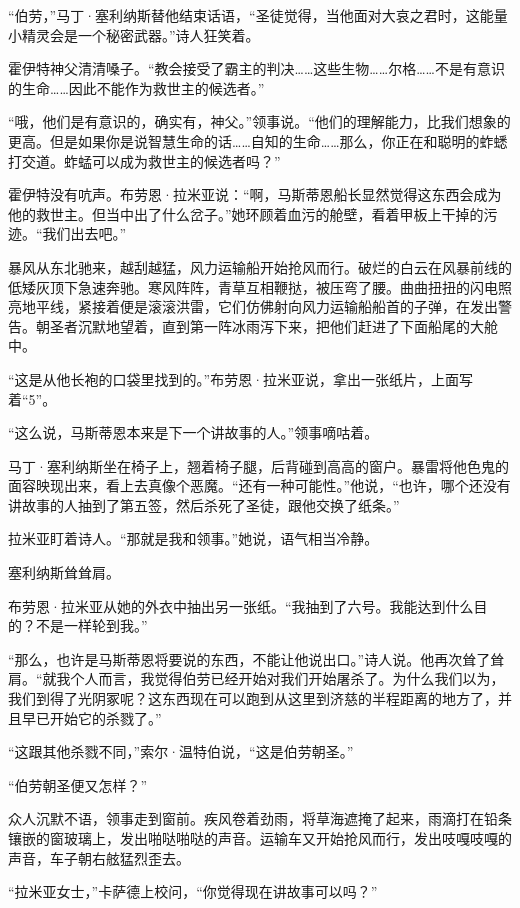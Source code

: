 \documentclass[AutoFakeBold=true]{book}
\begin{document}
``伯劳，''马丁·塞利纳斯替他结束话语，``圣徒觉得，当他面对大哀之君时，这能量小精灵会是一个秘密武器。''诗人狂笑着。

霍伊特神父清清嗓子。``教会接受了霸主的判决……这些生物……尔格……不是有意识的生命……因此不能作为救世主的候选者。''

``哦，他们是有意识的，确实有，神父。''领事说。``他们的理解能力，比我们想象的更高。但是如果你是说智慧生命的话……自知的生命……那么，你正在和聪明的蚱蟋打交道。蚱蜢可以成为救世主的候选者吗？''

霍伊特没有吭声。布劳恩·拉米亚说：``啊，马斯蒂恩船长显然觉得这东西会成为他的救世主。但当中出了什么岔子。''她环顾着血污的舱壁，看着甲板上干掉的污迹。``我们出去吧。''

\vspace*{1em}

暴风从东北驰来，越刮越猛，风力运输船开始抢风而行。破烂的白云在风暴前线的低矮灰顶下急速奔驰。寒风阵阵，青草互相鞭挞，被压弯了腰。曲曲扭扭的闪电照亮地平线，紧接着便是滚滚洪雷，它们仿佛射向风力运输船船首的子弹，在发出警告。朝圣者沉默地望着，直到第一阵冰雨泻下来，把他们赶进了下面船尾的大舱中。

``这是从他长袍的口袋里找到的。''布劳恩·拉米亚说，拿出一张纸片，上面写着``5''。

``这么说，马斯蒂恩本来是下一个讲故事的人。''领事嘀咕着。

马丁·塞利纳斯坐在椅子上，翘着椅子腿，后背碰到高高的窗户。暴雷将他色鬼的面容映现出来，看上去真像个恶魔。``还有一种可能性。''他说，``也许，哪个还没有讲故事的人抽到了第五签，然后杀死了圣徒，跟他交换了纸条。''

拉米亚盯着诗人。``那就是我和领事。''她说，语气相当冷静。

塞利纳斯耸耸肩。

布劳恩·拉米亚从她的外衣中抽出另一张纸。``我抽到了六号。我能达到什么目的？不是一样轮到我。''

``那么，也许是马斯蒂恩将要说的东西，不能让他说出口。''诗人说。他再次耸了耸肩。``就我个人而言，我觉得伯劳已经开始对我们开始屠杀了。为什么我们以为，我们到得了光阴冢呢？这东西现在可以跑到从这里到济慈的半程距离的地方了，并且早已开始它的杀戮了。''

``这跟其他杀戮不同，''索尔·温特伯说，``这是伯劳朝圣。''

``伯劳朝圣便又怎样？''

众人沉默不语，领事走到窗前。疾风卷着劲雨，将草海遮掩了起来，雨滴打在铅条镶嵌的窗玻璃上，发出啪哒啪哒的声音。运输车又开始抢风而行，发出吱嘎吱嘎的声音，车子朝右舷猛烈歪去。

``拉米亚女士，''卡萨德上校问，``你觉得现在讲故事可以吗？''
\end{document}
